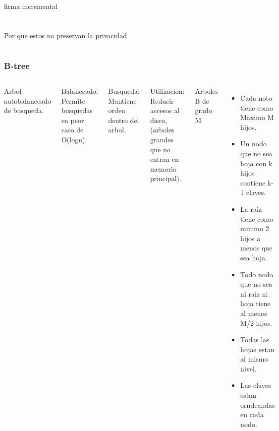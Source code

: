 \documentclass[10pt,handout]{beamer}
\begin{document}
\section{}
\begin{frame}
\frametitle{}
firma incremental

\end{frame}


\section{}
\begin{frame}
\frametitle{}
Por que estos no preservan la privacidad

\end{frame}

\section{}
\begin{frame}
\frametitle{B-tree}

\begin{columns}
        Arbol autobalanceado de busqueda.

Balanceado: Permite busquedas en peor caso de O(logn).

Busqueda: Mantiene orden dentro del arbol.

Utilizacion: Reducir accesos al disco, (arboles grandes que no entran en memoria principal).

Arboles B de grado M
        \begin{itemize}
          \item Cada noto tiene como Maximo M hijos.
          \item Un nodo que no sea hoja con k hijos contiene k-1 claves.
          \item La raiz tiene como minimo 2 hijos a menos que sea hoja.
          \item Todo nodo que no sea ni raiz ni hoja tiene al menos M/2 hijos.
          \item Todas las hojas estan al mismo nivel.
          \item Las claves estan orndeandas en cada nodo.
        \end{itemize}
\end{columns}
\end{frame}
\end{document}
